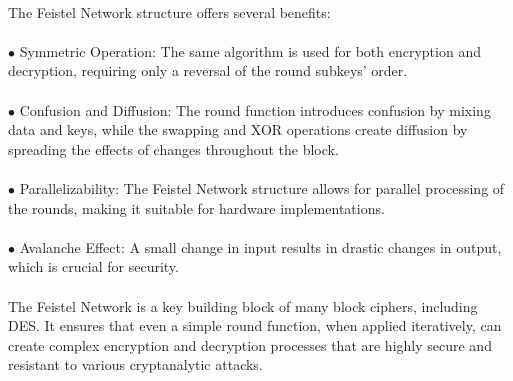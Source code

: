 \documentclass{report}
\begin{document}
\\
The Feistel Network structure offers several benefits:\\
\\
$\bullet$ Symmetric Operation: The same algorithm is used for both encryption and decryption, requiring only a reversal of the round subkeys' order.\\
\\
$\bullet$ Confusion and Diffusion: The round function introduces confusion by mixing data and keys, while the swapping and XOR operations create diffusion by spreading the effects of changes throughout the block.\\
\\
$\bullet$ Parallelizability: The Feistel Network structure allows for parallel processing of the rounds, making it suitable for hardware implementations.\\
\\
$\bullet$ Avalanche Effect: A small change in input results in drastic changes in output, which is crucial for security.\\
\\
The Feistel Network is a key building block of many block ciphers, including DES. It ensures that even a simple round function, when applied iteratively, can create complex encryption and decryption processes that are highly secure and resistant to various cryptanalytic attacks.
\end{document}
